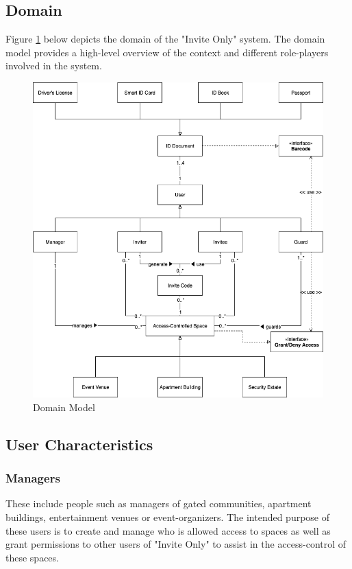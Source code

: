 \subsection{Domain}
Figure \ref{fig:domain_model} below depicts the domain of the "Invite Only" system. The domain model provides a high-level overview of the context and different role-players involved in the system.

\begin{figure}[H]
  \includegraphics[width=1.0\textwidth]{documentation/software_requirements_specification/overview/domain_model.png}
  \caption{Domain Model}
  \label{fig:domain_model}
\end{figure}

\subsection{User Characteristics}

\subsubsection{Managers}
These include people such as managers of gated communities, apartment buildings, entertainment venues or event-organizers. The intended purpose of these users is to create and manage who is allowed access to spaces as well as grant permissions to other users of "Invite Only" to assist in the access-control of these spaces.


